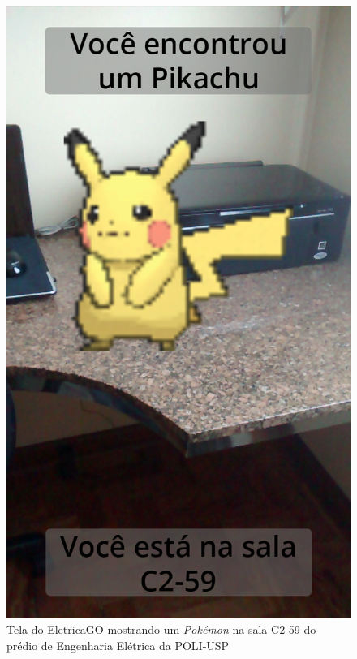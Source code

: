 \begin{figure}[H]
  \centering
  \begin{minipage}[b]{0.7\textwidth}
    
    \includegraphics[width=\textwidth]{imagens/screenshots/eletricaGo.png}
    \caption{Tela do EletricaGO mostrando um \textit{Pokémon} na sala C2-59 do prédio de Engenharia Elétrica da POLI-USP}
    \label{fig:telaEletericaGo}
  \end{minipage}
\end{figure}